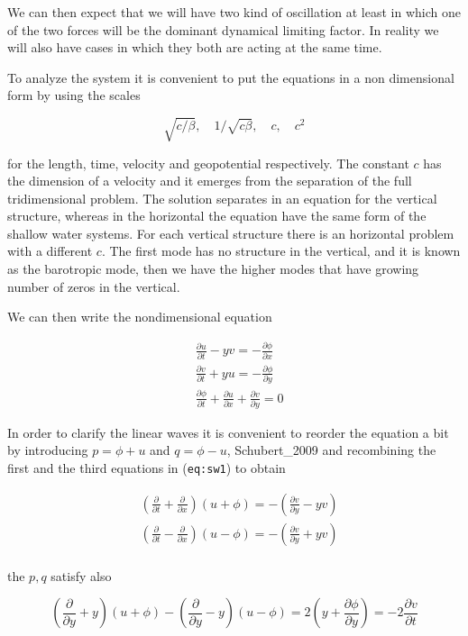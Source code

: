 We can then expect that we will have two kind of oscillation at least in
which one of the two forces will be the dominant dynamical limiting
factor. In reality we will also have cases in which they both are acting
at the same time.

To analyze the system it is convenient to put the equations in a non
dimensional form by using the scales

\[\sqrt{c/\beta}, \quad 1/\sqrt{c \beta}, \quad c, \quad c^2\]

for the length, time, velocity and geopotential respectively. The
constant \(c\) has the dimension of a velocity and it emerges from the
separation of the full tridimensional problem. The solution separates in
an equation for the vertical structure, whereas in the horizontal the
equation have the same form of the shallow water systems. For each
vertical structure there is an horizontal problem with a different
\(c\). The first mode has no structure in the vertical, and it is known
as the barotropic mode, then we have the higher modes that have growing
number of zeros in the vertical.

We can then write the nondimensional equation

\[\begin{aligned}
&\frac{\partial u}{\partial t} -  yv = - \frac{\partial \phi}{\partial x}\\
&\frac{\partial v}{\partial t} + yu = - \frac{\partial \phi}{\partial y}\\
&\frac{\partial \phi}{\partial t} +\frac{\partial u}{\partial x}+\frac{\partial v}{\partial y} = 0
\end{aligned}\]

In order to clarify the linear waves it is convenient to reorder the
equation a bit by introducing \(p=\phi+ u\) and \(q=\phi- u\),
Schubert\_2009 and recombining the first and the third equations in
(\texttt{eq:sw1}) to obtain

\[\begin{aligned}
&(\frac{\partial }{\partial t}+\frac{\partial }{\partial x})(u+\phi ) =  -( \frac{\partial v}{\partial y} -y v)\\
&(\frac{\partial }{\partial t}-\frac{\partial }{\partial x})(u-\phi ) =   -( \frac{\partial v}{\partial y} +y v)\\
\end{aligned}\]

the \(p,q\) satisfy also

\[\left(\frac{\partial }{\partial y} +y\right)(u+\phi) - \left(\frac{\partial }{\partial y} -y\right)(u-\phi) = 2\left(  y +\frac{\partial \phi}{\partial y}\right)= - 2 \frac{\partial v}{\partial t}\]

